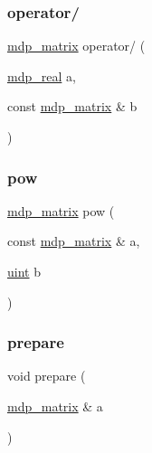 \mbox{\label{classmdp__matrix_a78e9bd78d0aa894b75fa5e92e195d327}} 
\subsubsection{\texorpdfstring{operator/}{operator/}\hspace{0.1cm}{\footnotesize\ttfamily [5/5]}}
{\footnotesize\ttfamily \hyperlink{classmdp__matrix}{mdp\+\_\+matrix} operator/ (\begin{DoxyParamCaption}\item[{\hyperlink{mdp__global__vars_8h_a69d96b74c791e0bbdb888b3913a69450}{mdp\+\_\+real}}]{a,  }\item[{const \hyperlink{classmdp__matrix}{mdp\+\_\+matrix} \&}]{b }\end{DoxyParamCaption})\hspace{0.3cm}{\ttfamily [friend]}}

\mbox{\label{classmdp__matrix_aed471057fee36406313f0d6db8469981}} 
\subsubsection{\texorpdfstring{pow}{pow}}
{\footnotesize\ttfamily \hyperlink{classmdp__matrix}{mdp\+\_\+matrix} pow (\begin{DoxyParamCaption}\item[{const \hyperlink{classmdp__matrix}{mdp\+\_\+matrix} \&}]{a,  }\item[{\hyperlink{mdp__global__vars_8h_a91ad9478d81a7aaf2593e8d9c3d06a14}{uint}}]{b }\end{DoxyParamCaption})\hspace{0.3cm}{\ttfamily [friend]}}

\mbox{\label{classmdp__matrix_a9b5dd55d85b884176c25b3f0967285f0}} 
\subsubsection{\texorpdfstring{prepare}{prepare}}
{\footnotesize\ttfamily void prepare (\begin{DoxyParamCaption}\item[{\hyperlink{classmdp__matrix}{mdp\+\_\+matrix} \&}]{a }\end{DoxyParamCaption})\hspace{0.3cm}{\ttfamily [friend]}}

